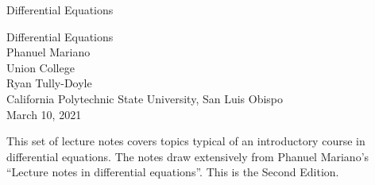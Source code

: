 \documentclass[oneside,10pt,]{book}
\newcommand{\titlepagefont}{\relax}
\numberwithin{equation}{section}
\numberwithin{equation}{section}
\begin{document}
\frontmatter
\thispagestyle{empty}
{\titlepagefont\centering
\vspace*{0.28\textheight}
{\Huge Differential Equations}\\}
\clearpage
\thispagestyle{empty}
{\titlepagefont\centering
\vspace*{0.14\textheight}
{\Huge Differential Equations}\\[3\baselineskip]
{\Large Phanuel Mariano}\\[0.5\baselineskip]
{\Large Union College}\\[3\baselineskip]
{\Large Ryan Tully-Doyle}\\[0.5\baselineskip]
{\Large California Polytechnic State University, San Luis Obispo}\\[3\baselineskip]
{\Large March 10, 2021}\\}
\clearpage
\thispagestyle{empty}
\null\clearpage
This set of lecture notes covers topics typical of an introductory course in differential equations. The notes draw extensively from Phanuel Mariano's ``Lecture notes in differential equations''.%
 This is the Second Edition.%
\setcounter{tocdepth}{1}
\renewcommand*\contentsname{Contents}
\tableofcontents
\mainmatter
%
%
\typeout{************************************************}
\typeout{************************************************}
%
\end{document}
